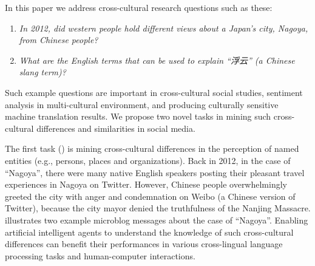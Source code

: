 In this paper we address cross-cultural research questions such as these:
\vspace{5pt}
\begin{enumerate}
\item {\em In 2012, did western people hold different views about a Japan's city, Nagoya, from Chinese people?}
\item {\em What are the English terms that can be used to explain ``浮云'' (a Chinese slang term)?}
\end{enumerate}
\vspace{5pt}
Such example questions are important in cross-cultural social studies, sentiment analysis in multi-cultural environment, and producing culturally sensitive machine translation results. 
We propose two novel tasks in mining such cross-cultural differences and similarities in social media.

The first task () is mining cross-cultural differences in
the perception of named entities (e.g., persons, places and organizations). 
Back in 2012, in the case of ``Nagoya'', there were many native English speakers posting their pleasant travel experiences in Nagoya on Twitter.
However, Chinese people overwhelmingly greeted the city with anger and 
condemnation on Weibo (a Chinese version of Twitter), because the city mayor denied the truthfulness of the Nanjing Massacre.
 illustrates two example microblog messages about the case of ``Nagoya''.
Enabling artificial intelligent agents to understand the knowledge of such cross-cultural differences can benefit their performances in various
cross-lingual language processing tasks and human-computer interactions.

